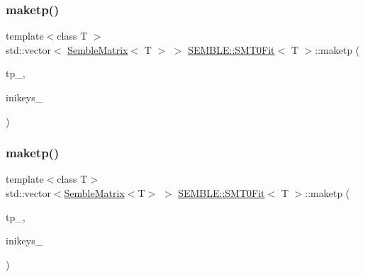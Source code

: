 \subsubsection{\texorpdfstring{maketp()}{maketp()}\hspace{0.1cm}{\footnotesize\ttfamily [1/2]}}
{\footnotesize\ttfamily template$<$class T $>$ \\
std\+::vector$<$ \mbox{\hyperlink{structSEMBLE_1_1SembleMatrix}{Semble\+Matrix}}$<$ T $>$ $>$ \mbox{\hyperlink{structSEMBLE_1_1SMT0Fit}{S\+E\+M\+B\+L\+E\+::\+S\+M\+T0\+Fit}}$<$ T $>$\+::maketp (\begin{DoxyParamCaption}\item[{const typename \mbox{\hyperlink{structSEMBLE_1_1PromoteCorr}{Promote\+Corr}}$<$ T $>$\+::Type \&}]{tp\+\_\+,  }\item[{const Fit\+Ini\+Props\+\_\+t \&}]{inikeys\+\_\+ }\end{DoxyParamCaption})}

\mbox{\label{structSEMBLE_1_1SMT0Fit_a7c06f2de2ced6b21d3a89f233a7237c7}} 
\subsubsection{\texorpdfstring{maketp()}{maketp()}\hspace{0.1cm}{\footnotesize\ttfamily [2/2]}}
{\footnotesize\ttfamily template$<$class T$>$ \\
std\+::vector$<$\mbox{\hyperlink{structSEMBLE_1_1SembleMatrix}{Semble\+Matrix}}$<$T$>$ $>$ \mbox{\hyperlink{structSEMBLE_1_1SMT0Fit}{S\+E\+M\+B\+L\+E\+::\+S\+M\+T0\+Fit}}$<$ T $>$\+::maketp (\begin{DoxyParamCaption}\item[{const typename \mbox{\hyperlink{structSEMBLE_1_1PromoteCorr}{Promote\+Corr}}$<$ T $>$\+::Type \&}]{tp\+\_\+,  }\item[{const Fit\+Ini\+Props\+\_\+t \&}]{inikeys\+\_\+ }\end{DoxyParamCaption})}

\mbox{\label{structSEMBLE_1_1SMT0Fit_a7fbbf0aedac972669c1c3c7102a1af4e}} 
